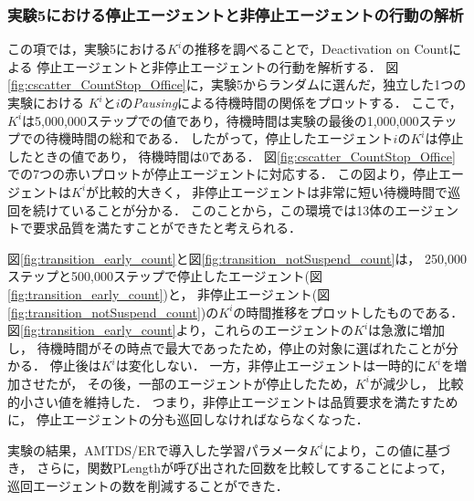 \documentclass[12pt,a4j,twoside]{jarticle}
\begin{document}
  \subsubsection{実験5における停止エージェントと非停止エージェントの行動の解析}\label{sec:ex5Analsis}
  この項では，実験5における$K^i$の推移を調べることで，Deactivation on Countによる
  停止エージェントと非停止エージェントの行動を解析する．
  図\ref{fig:cscatter_CountStop_Office}に，実験5からランダムに選んだ，独立した1つの実験における
  $K^i$と$i$の{\em Pausing}による待機時間の関係をプロットする．
  ここで，$K^i$は5,000,000ステップでの値であり，待機時間は実験の最後の1,000,000ステップでの待機時間の総和である．
  したがって，停止したエージェント$i$の$K^i$は停止したときの値であり，
  待機時間は0である．
  図\ref{fig:cscatter_CountStop_Office}での7つの赤いプロットが停止エージェントに対応する．
  この図より，停止エージェントは$K^i$が比較的大きく，
  非停止エージェントは非常に短い待機時間で巡回を続けていることが分かる．
  このことから，この環境では13体のエージェントで要求品質を満たすことができたと考えられる．
  \par

  図\ref{fig:transition_early_count}と図\ref{fig:transition_notSuspend_count}は，
  250,000ステップと500,000ステップで停止したエージェント(図\ref{fig:transition_early_count})と，
  非停止エージェント(図\ref{fig:transition_notSuspend_count})の$K^i$の時間推移をプロットしたものである．
  図\ref{fig:transition_early_count}より，これらのエージェントの$K^i$は急激に増加し，
  待機時間がその時点で最大であったため，停止の対象に選ばれたことが分かる．
  停止後は$K^i$は変化しない．
  一方，非停止エージェントは一時的に$K^i$を増加させたが，
  その後，一部のエージェントが停止したため，$K^i$が減少し，
  比較的小さい値を維持した．
  つまり，非停止エージェントは品質要求を満たすために，
  停止エージェントの分も巡回しなければならなくなった．
  \par

  実験の結果，AMTDS/ERで導入した学習パラメータ$K^i$により，この値に基づき，
  さらに，関数\textsf{PLength}が呼び出された回数を比較してすることによって，
  巡回エージェントの数を削減することができた．
\end{document}
